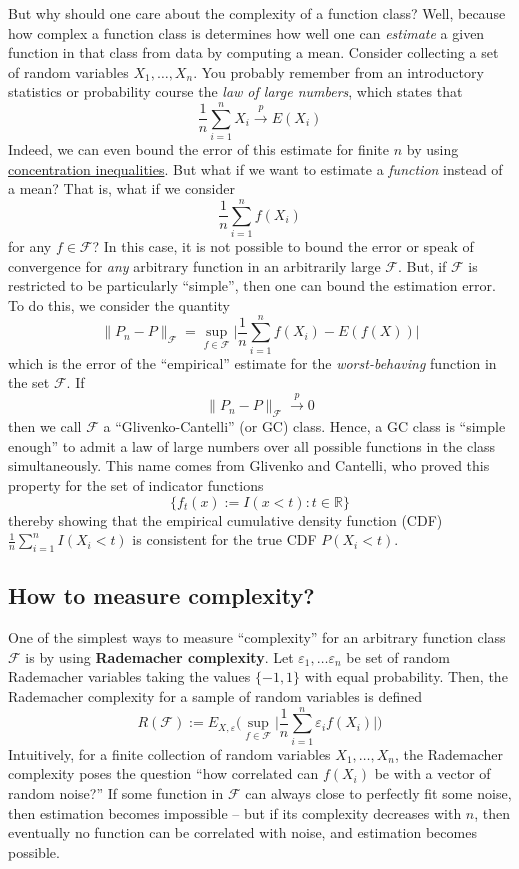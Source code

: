 \documentclass[
]{article}
\begin{document}
But why should one care about the complexity of a function class? Well,
because how complex a function class is determines how well one can
\emph{estimate} a given function in that class from data by computing a
mean. Consider collecting a set of random variables
\(X_1, \ldots, X_n\). You probably remember from an introductory
statistics or probability course the \emph{law of large numbers}, which
states that
\[\frac{1}{n}\sum_{i=1}^n X_i \overset{p}{\rightarrow} E(X_i)\] Indeed,
we can even bound the error of this estimate for finite \(n\) by using
\href{Concentration\%20Inequalities\%20Made\%20Simple\%20}{concentration inequalities}.
But what if we want to estimate a \emph{function} instead of a mean?
That is, what if we consider \[\frac{1}{n}\sum_{i=1}^n f(X_i)\] for any
\(f \in \mathscr{F}\)? In this case, it is not possible to bound the
error or speak of convergence for \emph{any} arbitrary function in an
arbitrarily large \(\mathscr{F}\). But, if \(\mathscr{F}\) is restricted
to be particularly ``simple'', then one can bound the estimation error.
To do this, we consider the quantity
\[\lVert P_n - P \rVert_{\mathscr{F}} = \sup_{f \in \mathscr{F}} \Big | \frac{1}{n} \sum_{i=1}^nf(X_i) - E(f(X))\Big|\]
which is the error of the ``empirical'' estimate for the
\emph{worst-behaving} function in the set \(\mathscr{F}\). If
\[\lVert P_n - P \rVert_{\mathscr{F}} \overset{p}{\rightarrow} 0\] then
we call \(\mathscr{F}\) a ``Glivenko-Cantelli'' (or GC) class. Hence, a
GC class is ``simple enough'' to admit a law of large numbers over all
possible functions in the class simultaneously. This name comes from
Glivenko and Cantelli, who proved this property for the set of indicator
functions \[\{f_t(x) := I(x < t) : t \in \mathbb{R}\}\] thereby showing
that the empirical cumulative density function (CDF)
\(\frac{1}{n}\sum_{i=1}^n I(X_i < t)\) is consistent for the true CDF
\(P(X_i < t)\).

\hypertarget{how-to-measure-complexity}{%
\subsection{How to measure
complexity?}\label{how-to-measure-complexity}}

One of the simplest ways to measure ``complexity'' for an arbitrary
function class \(\mathscr{F}\) is by using \textbf{Rademacher
complexity}. Let \(\varepsilon_1, \ldots \varepsilon_n\) be set of
random Rademacher variables taking the values \(\{-1, 1\}\) with equal
probability. Then, the Rademacher complexity for a sample of random
variables is defined
\[R(\mathscr{F}) := E_{X, \varepsilon}\Big(\sup_{f \in \mathscr{F}} \Big| \frac{1}{n}\sum_{i=1}^n \varepsilon_i f(X_i)\Big|\Big)\]
Intuitively, for a finite collection of random variables
\(X_1,\ldots, X_n\), the Rademacher complexity poses the question ``how
correlated can \(f(X_i)\) be with a vector of random noise?'' If some
function in \(\mathscr{F}\) can always close to perfectly fit some
noise, then estimation becomes impossible -- but if its complexity
decreases with \(n\), then eventually no function can be correlated with
noise, and estimation becomes possible.
\end{document}
